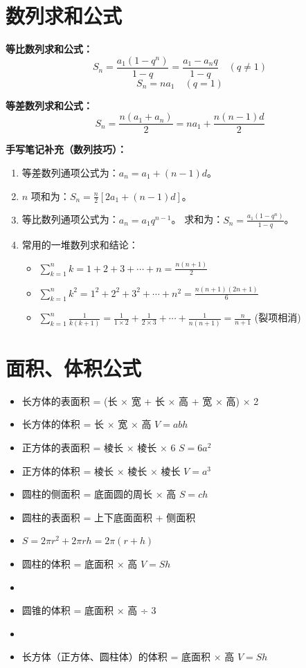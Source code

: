 \documentclass[a4paper,12pt]{ctexart}
\begin{document}
\section*{数列求和公式}

\textbf{等比数列求和公式：}
\[ S_n = \frac{a_1(1-q^n)}{1-q} = \frac{a_1 - a_n q}{1-q} \quad (q \neq 1) \]
\[ S_n = n a_1 \quad (q = 1) \]

\textbf{等差数列求和公式：}
\[ S_n = \frac{n(a_1 + a_n)}{2} = n a_1 + \frac{n(n-1)d}{2} \]

\vspace{0.5cm}
\noindent\textbf{手写笔记补充（数列技巧）：}
\begin{enumerate}
    \item 等差数列通项公式为：$a_n = a_1 + (n-1)d$。
    \item $n$ 项和为：$S_n = \frac{n}{2}[2a_1 + (n-1)d]$。
    \item 等比数列通项公式为：$a_n = a_1 q^{n-1}$。
          求和为：$S_n = \frac{a_1(1-q^n)}{1-q}$。
    \item 常用的一堆数列求和结论：
          \begin{itemize}
              \item $\sum_{k=1}^n k = 1 + 2 + 3 + \cdots + n = \frac{n(n+1)}{2}$
              \item $\sum_{k=1}^n k^2 = 1^2 + 2^2 + 3^2 + \cdots + n^2 = \frac{n(n+1)(2n+1)}{6}$
              \item $\sum_{k=1}^n \frac{1}{k(k+1)} = \frac{1}{1\times 2} + \frac{1}{2\times 3} + \cdots + \frac{1}{n(n+1)} = \frac{n}{n+1}$ (裂项相消)
          \end{itemize}
\end{enumerate}

\section*{面积、体积公式}

\begin{itemize}
    \item 长方体的表面积 = (长 × 宽 + 长 × 高 + 宽 × 高) × 2
    \item 长方体的体积 = 长 × 宽 × 高 \quad $V = abh$
    \item 正方体的表面积 = 棱长 × 棱长 × 6 \quad $S = 6a^2$
    \item 正方体的体积 = 棱长 × 棱长 × 棱长 \quad $V = a^3$
    \item 圆柱的侧面积 = 底面圆的周长 × 高 \quad $S = ch$
    \item 圆柱的表面积 = 上下底面面积 + 侧面积
    \item $S = 2\pi r^2 + 2\pi rh = 2\pi(r+h)$
    \item 圆柱的体积 = 底面积 × 高 \quad $V = Sh$
    \item {}
    \item 圆锥的体积 = 底面积 × 高 ÷ 3
    \item {}
    \item 长方体（正方体、圆柱体）的体积 = 底面积 × 高 \quad $V = Sh$
\end{itemize}
\end{document}
